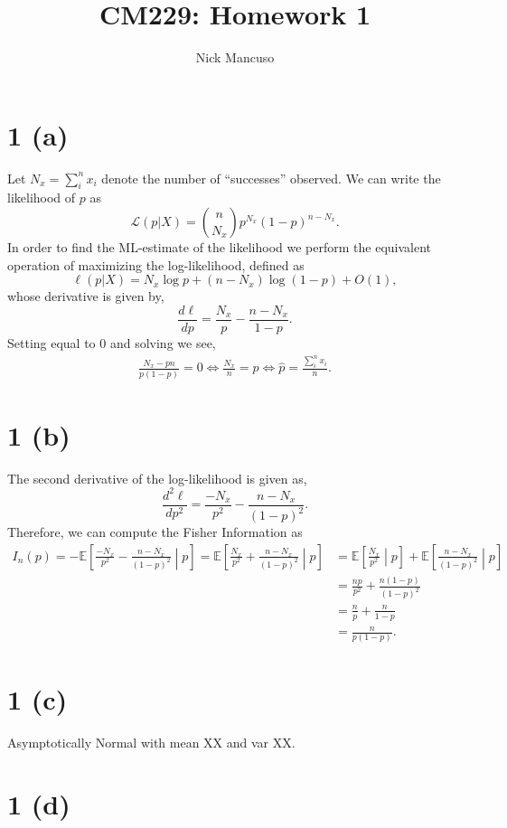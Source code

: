 \documentclass[10pt]{article}
\def\E{\mathbb{E}}
\begin{document}
\title{CM229: Homework 1}
\author{Nick Mancuso}
\maketitle

\section*{1 (a)}
Let $N_x = \sum_i^n x_i$ denote the number of ``successes'' observed. We can write the
likelihood of $p$ as \[ \mathcal{L}(p| X) = {n \choose N_x} p^{N_x} (1 - p)^{n - N_x}.\] In order
to find the ML-estimate of the likelihood we perform the equivalent operation of maximizing the
log-likelihood, defined as \[\ell(p | X) = N_x \log p + (n - N_x) \log (1 - p) + O(1),\] whose
derivative is given by, \[ \frac{d \ell}{d p} = \frac{N_x}{p} - \frac{n - N_x}{1 - p}.\] Setting
equal to 0 and solving we see,
\begin{align*}
    \frac{N_x - pn}{p(1 - p)} = 0 \Leftrightarrow 
    \frac{N_x}{n} = p \Leftrightarrow 
    \hat{p} = \frac{\sum_i^n x_i}{n}.
\end{align*}

\section*{1 (b)}
The second derivative of the log-likelihood is given as, 
\[ \frac{d^2 \ell}{d p^2} = \frac{-N_x}{p^2} - \frac{n - N_x}{(1 - p)^2}.\] Therefore, we can
compute the Fisher Information as
\begin{align*}
    I_n(p) = -\E\left[\frac{-N_x}{p^2} - \frac{n - N_x}{(1 - p)^2} \middle\rvert p \right] = 
    \E\left[\frac{N_x}{p^2} + \frac{n - N_x}{(1 - p)^2} \middle\rvert p \right]
    &= \E\left[\frac{N_x}{p^2} \middle\rvert p\right] + \E\left[\frac{n - N_x}{(1 - p)^2} \middle\rvert p \right] \\
    &= \frac{n p}{p^2} + \frac{n (1 - p)}{(1 - p)^2}\\
    &= \frac{n}{p} + \frac{n}{1 - p} \\
    &= \frac{n}{p(1 - p)}.
\end{align*}
\section*{1 (c)}
Asymptotically Normal with mean XX and var XX.
\section*{1 (d)}
\end{document}
